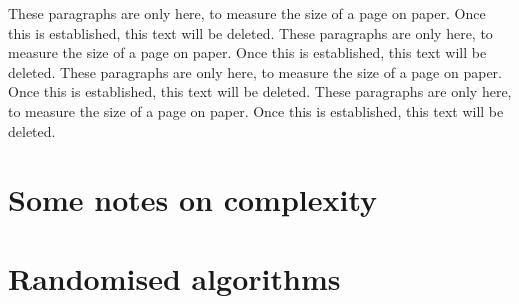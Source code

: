 These paragraphs are only here, to measure the size of a page on paper.
Once this is established, this text will be deleted.
These paragraphs are only here, to measure the size of a page on paper.
Once this is established, this text will be deleted.
These paragraphs are only here, to measure the size of a page on paper.
Once this is established, this text will be deleted.
These paragraphs are only here, to measure the size of a page on paper.
Once this is established, this text will be deleted.

\section{Some notes on complexity}

\section{Randomised algorithms}

